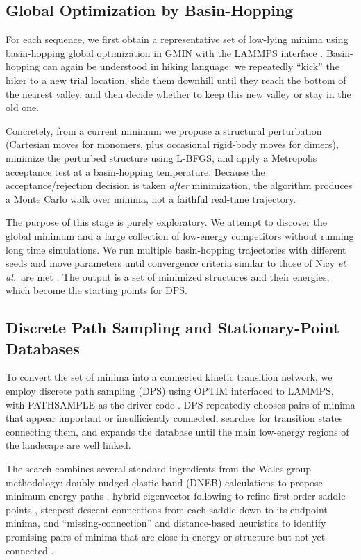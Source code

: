 \subsection{Global Optimization by Basin-Hopping}\label{subsec:basin-hopping}

For each sequence, we first obtain a representative set of low-lying minima using
basin-hopping global optimization in GMIN with the LAMMPS interface
\cite{Wales1997BasinHopping,Nicy2024Mpipi}. Basin-hopping can again be understood in
hiking language: we repeatedly ``kick'' the hiker to a new trial location, slide them
downhill until they reach the bottom of the nearest valley, and then decide whether to
keep this new valley or stay in the old one.

Concretely, from a current minimum we propose a structural perturbation (Cartesian moves
for monomers, plus occasional rigid-body moves for dimers), minimize the perturbed
structure using L-BFGS, and apply a Metropolis acceptance test at a basin-hopping
temperature. Because the acceptance/rejection decision is taken \emph{after} minimization,
the algorithm produces a Monte Carlo walk over minima, not a faithful real-time trajectory.

The purpose of this stage is purely exploratory. We attempt to discover the global
minimum and a large collection of low-energy competitors without running long time
simulations. We run multiple basin-hopping trajectories with different seeds and move
parameters until convergence criteria similar to those of Nicy \emph{et al.}\ are met
\cite{Nicy2024Mpipi}. The output is a set of minimized structures and their energies,
which become the starting points for DPS.

\subsection{Discrete Path Sampling and Stationary-Point Databases}\label{subsec:dps}

To convert the set of minima into a connected kinetic transition network, we employ
discrete path sampling (DPS) using OPTIM interfaced to LAMMPS, with PATHSAMPLE as the
driver code \cite{Wales2002DPS,Wales2003Book,Nicy2024Mpipi}. DPS repeatedly chooses
pairs of minima that appear important or insufficiently connected, searches for
transition states connecting them, and expands the database until the main low-energy
regions of the landscape are well linked.

The search combines several standard ingredients from the Wales group methodology:
doubly-nudged elastic band (DNEB) calculations to propose minimum-energy paths
\cite{Trygubenko2004DNEB}, hybrid eigenvector-following to refine first-order saddle
points \cite{Munro1999HEF}, steepest-descent connections from each saddle down to its
endpoint minima, and ``missing-connection'' and distance-based heuristics to identify
promising pairs of minima that are close in energy or structure but not yet connected
\cite{Roder2018Abeta}.

